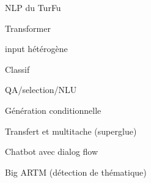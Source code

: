 \begin{frame}{NLP du TurFu}
    \item Transformer
    \item input hétérogène
    \item Classif
    \item QA/selection/NLU
    \item Génération conditionnelle
    \item Transfert et multitache (superglue)
    \item Chatbot avec dialog flow
    \item Big ARTM (détection de thématique)
\end{frame}
